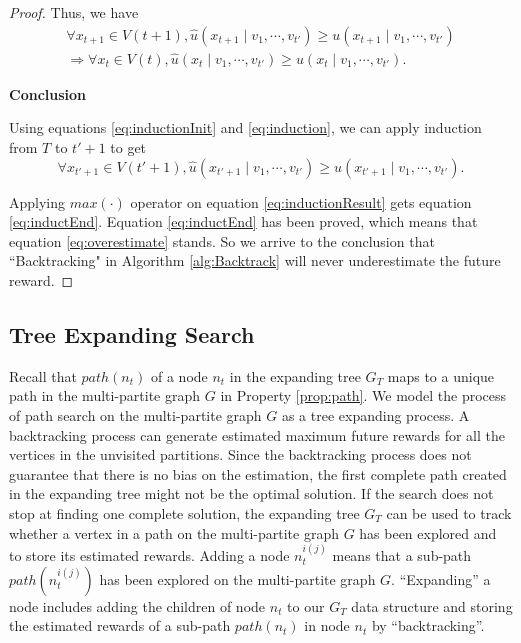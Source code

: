 \begin{lem}
\begin{proof}
Thus, we have
\begin{equation}
\label{eq:induction}
\begin{aligned}
\forall x_{t+1} \in V(t+1), \hat{u}( x_{t+1} \mid v_{1} , \cdots , v_{t'} ) \geq u( x_{t+1} \mid v_{1} , \cdots , v_{t'} )  \\
\Rightarrow  \forall x_{t} \in V(t), \hat{u}( x_{t} \mid v_{1} , \cdots , v_{t'} ) \geq u( x_{t} \mid v_{1} , \cdots , v_{t'} ).
\end{aligned}
\end{equation}

\textbf{Conclusion}

Using equations \eqref{eq:inductionInit} and \eqref{eq:induction}, we can apply induction from $ T $ to $ t'+1 $ to get
\begin{equation}
\label{eq:inductionResult}
\forall x_{t'+1} \in V(t'+1), \hat{u}( x_{t'+1} \mid v_{1} , \cdots , v_{t'} ) \geq u( x_{t'+1} \mid v_{1} , \cdots , v_{t'} ).
\end{equation}

Applying $ max(\cdot) $ operator on equation \eqref{eq:inductionResult} gets equation \eqref{eq:inductEnd}.
Equation \eqref{eq:inductEnd} has been proved, which means that equation \eqref{eq:overestimate} stands.
So we arrive to the conclusion that ``Backtracking" in Algorithm \ref{alg:Backtrack} will never underestimate the future reward.

\end{proof}
\end{lem}

\subsection{Tree Expanding Search}
\label{subsec:tree_expanding_search}

Recall that $ path(n_{t}) $ of a node $ n_{t} $ in the expanding tree $ G_{T} $ maps to a unique path in the multi-partite graph $ G $ in Property \ref{prop:path}.
We model the process of path search on the multi-partite graph $ G $ as a tree expanding process.
A backtracking process can generate estimated maximum future rewards for all the vertices in the unvisited partitions.
Since the backtracking process does not guarantee that there is no bias on the estimation, the first complete path created in the expanding tree might not be the optimal solution.
If the search does not stop at finding one complete solution, the expanding tree $ G_{T} $ can be used to track whether a vertex in a path on the multi-partite graph $ G $ has been explored and to store its estimated rewards.
Adding a node $ n^{i(j)}_{t} $ means that a sub-path $ path( n^{i(j)}_{t} ) $ has been explored on the multi-partite graph $ G $.
``Expanding'' a node includes adding the children of node $ n_{t} $ to our $ G_{T} $ data structure and storing the estimated rewards of a sub-path $ path(n_{t}) $ in node $ n_{t} $ by ``backtracking''.

